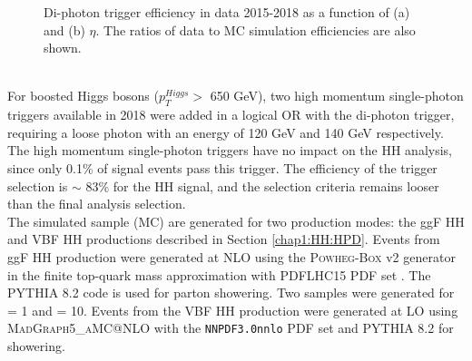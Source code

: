 \begin{figure}[htbp]
    \centering
    \caption{Di-photon trigger efficiency in data 2015-2018 as a function of (a) \eT and (b) $\eta$. The ratios of data to MC simulation efficiencies are also shown.}
    \label{fig:HHyybb:Data&MC:Trig}
\end{figure}
\\
For boosted Higgs bosons ($p_T^{Higgs} > $ 650 GeV), two high momentum single-photon triggers available in 2018 were added in a logical OR with the di-photon trigger, requiring a loose photon with an energy of 120 GeV and 140 GeV respectively. The high momentum single-photon triggers have no impact on the HH analysis, since only 0.1\% of signal events pass this trigger. The efficiency of the trigger selection is $\sim$ 83\% for the HH signal, and the selection criteria remains looser than the final analysis selection. 
\\

The simulated \HHyybb sample (MC) are generated for two production modes: the ggF HH and VBF HH productions described in Section \ref{chap1:HH:HPD}. Events from ggF HH production were generated at NLO using the \textsc{Powheg-Box} v2 generator in the finite top-quark mass approximation with PDFLHC15 PDF set \cite{HH_FT, HH_Powheg, PDF4LHC}. The \textsc{PYTHIA} 8.2 code is used for parton showering. Two samples were generated for \kl= 1 and \kl= 10. Events from the VBF HH production were generated at LO  using \textsc{MadGraph5\_aMC@NLO} \cite{HH_VBF} with the \texttt{NNPDF3.0nnlo} PDF set \cite{VBF_PDF} and \textsc{PYTHIA} 8.2 for showering. \\

